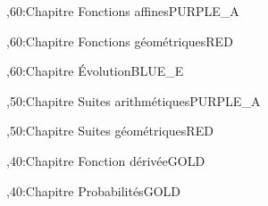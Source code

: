 \documentclass[tikz]{standalone}
\begin{document}
%
	\begin{chart}
	,60:{Chapitre }{Fonctions affines}{}{PURPLE_A}
	
	,60:{Chapitre }{Fonctions géométriques}{}{RED}
	
	,60:{Chapitre }{Évolution}{}{BLUE_E}
	
	,50:{Chapitre }{Suites arithmétiques}{}{PURPLE_A}
	
	,50:{Chapitre }{Suites géométriques}{}{RED}
	
	,40:{Chapitre }{Fonction dérivée}{}{GOLD}
	
	,40:{Chapitre }{Probabilités}{}{GOLD}
	
	
	
	
	
	
	
	
	
	

	
	
	
	
	
	
	\end{chart}
%
\end{document}
